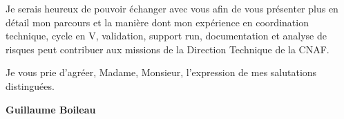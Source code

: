 \documentclass[11pt,a4paper]{altacv}
\begin{document}
{Je serais heureux de pouvoir échanger avec vous afin de vous présenter plus en détail mon parcours et la manière dont mon expérience en coordination technique, cycle en V, validation, support run, documentation et analyse de risques peut contribuer aux missions de la Direction Technique de la CNAF.

Je vous prie d'agréer, Madame, Monsieur, l'expression de mes salutations distinguées.

\textbf{Guillaume Boileau}

}
\end{document}
